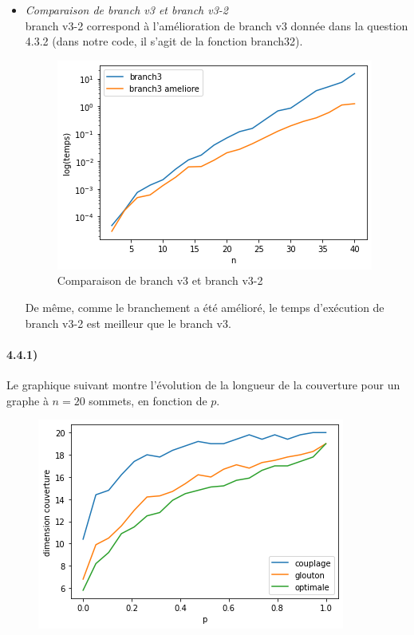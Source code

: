 \documentclass[12pt]{article}
\begin{document}
\begin{itemize}
            \item \textit{Comparaison de branch v3 et branch v3-2} \\
                branch v3-2 correspond à l'amélioration de branch v3 donnée dans la question 4.3.2 (dans notre code, il s'agit de la fonction branch32). \\
            \begin{figure}[h]
                \caption{Comparaison de branch v3 et branch v3-2}
                \includegraphics[scale=0.6]{figures/branch3-3amel.png}
                \centering
            \end{figure}
            De même, comme le branchement a été amélioré, le temps d'exécution de branch v3-2 est meilleur que le branch v3.
            
        \end{itemize}
        

    \paragraph{4.4.1)}
        Le graphique suivant montre l'évolution de la longueur de la couverture pour un graphe à $n=20$ sommets, en fonction de $p$.

        \begin{figure}[H]
            \includegraphics[scale=0.5]{figures/qualite_pvar.png}
            \centering
        \end{figure}
\end{document}
